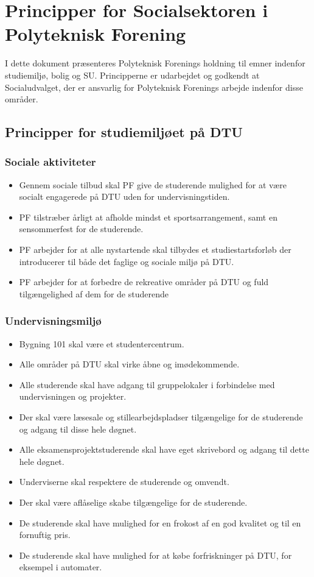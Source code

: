 \section{Principper for Socialsektoren i Polyteknisk Forening}
I dette dokument præsenteres Polyteknisk Forenings holdning til emner indenfor studiemiljø, bolig og SU. Principperne er udarbejdet og godkendt at Socialudvalget, der er ansvarlig for Polyteknisk Forenings arbejde indenfor disse områder.
\subsection{Principper for studiemiljøet på DTU}
\subsubsection{Sociale aktiviteter}
\begin{itemize}
\item Gennem sociale tilbud skal PF give de studerende mulighed for at være socialt engagerede på DTU uden for undervisningstiden.
\item PF tilstræber årligt at afholde mindst et sportsarrangement, samt en sensommerfest for de studerende.
\item PF arbejder for at alle nystartende skal tilbydes et studiestartsforløb der introducerer til både det faglige og sociale miljø på DTU.
\item PF arbejder for at forbedre de rekreative områder på DTU og fuld tilgængelighed af dem for de studerende
\end{itemize}

\subsubsection{Undervisningsmiljø}
\begin{itemize}
\item Bygning 101 skal være et studentercentrum.
\item Alle områder på DTU skal virke åbne og imødekommende.
\item Alle studerende skal have adgang til gruppelokaler i forbindelse med undervisningen og projekter.
\item  Der skal være læsesale og stillearbejdspladser tilgængelige for de studerende og adgang til disse hele døgnet.
\item Alle eksamensprojektstuderende skal have eget skrivebord og adgang til dette hele døgnet.
\item Underviserne skal respektere de studerende og omvendt.
\item Der skal være aflåselige skabe tilgængelige for de studerende.
\item De studerende skal have mulighed for en frokost af en god kvalitet og til en fornuftig pris.
\item De studerende skal have mulighed for at købe forfriskninger på DTU, for eksempel i automater.
\end{itemize}

